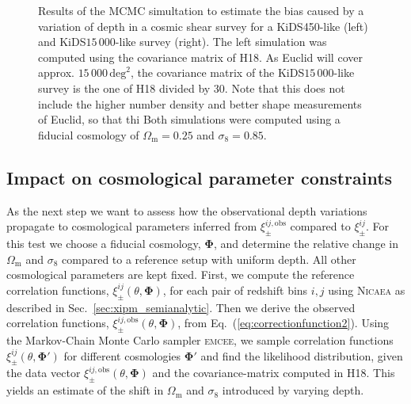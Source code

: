 \documentclass{aa}
\renewcommand{\rm}{\mathrm}
\def\b#1{\bm{#1}}
\begin{document}
\begin{figure}
\begin{subfigure}{0.45\textwidth}
\end{subfigure}
\caption{Results of the MCMC simultation to estimate the bias caused by a variation of depth in a cosmic shear survey for a KiDS450-like (left) and KiDS$15\,000$-like survey (right). The left simulation was computed using the covariance matrix of H18. As Euclid will cover approx. $15\,000\,\rm{deg}^2$, the covariance matrix of the KiDS$15\,000$-like survey is the one of H18 divided by 30. Note that this does not include the higher number density and better shape measurements of Euclid, so that thi Both simulations were computed using a fiducial cosmology of $\Omega_{\rm{m}}=0.25$ and $\sigma_8 = 0.85$.}
\label{fig:mcmc_results}
\end{figure} 

\subsection{Impact on cosmological parameter constraints}

As the next step we want to assess how the observational depth variations propagate to cosmological parameters inferred from $\xi_\pm^{ij,\rm{obs}}$ compared to $\xi_\pm^{ij}$. For this test we choose a fiducial cosmology, $\b \Phi$, and determine the relative change in $\Omega_{\rm m}$ and $\sigma_8$ compared to a reference setup with uniform depth. All other cosmological parameters are kept fixed. First, we compute the reference correlation functions, $\xi_\pm^{ij}(\theta,\b\Phi)$, for each pair of redshift bins $i,j$ using \textsc{Nicaea} as described in Sec.~\ref{sec:xipm_semianalytic}. Then we derive the observed correlation functions, $\xi_\pm^{ij,\rm{obs}}(\theta,\b\Phi)$, from Eq.~(\ref{eq:correctionfunction2}). Using the Markov-Chain Monte Carlo sampler \textsc{emcee}, we sample correlation functions $\xi_\pm^{ij}(\theta,\b\Phi')$ for different cosmologies $\b\Phi'$ and find the likelihood distribution, given the data vector $\xi_\pm^{ij,\rm{obs}}(\theta,\b\Phi)$ and the covariance-matrix computed in H18. This yields an estimate of the shift in $\Omega_{\rm m}$ and $\sigma_8$ introduced by varying depth.
\end{document}

